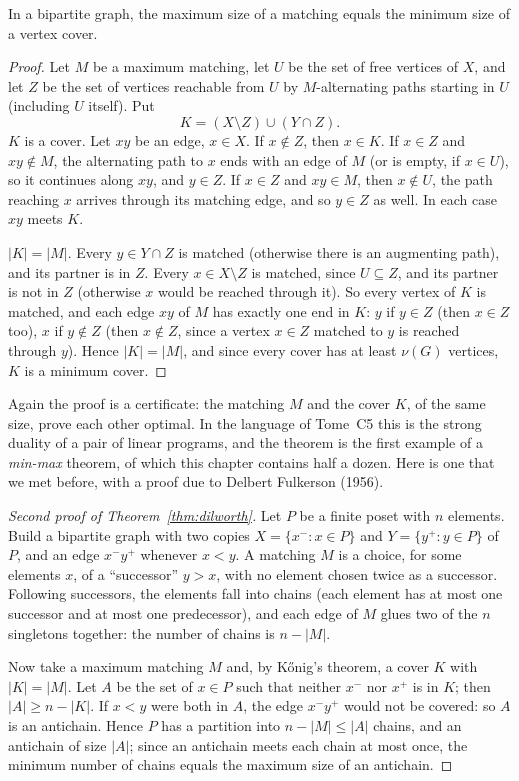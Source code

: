 \begin{theorem}\label{thm:konig}
In a bipartite graph, the maximum size of a matching equals the minimum size of a vertex cover.
\end{theorem}
\begin{proof}
Let $M$ be a maximum matching, let $U$ be the set of free vertices of $X$, and let $Z$ be the set of vertices reachable from $U$ by
$M$-alternating paths starting in $U$ (including $U$ itself). Put
\[
K=(X\setminus Z)\cup(Y\cap Z).
\]
$K$ is a cover. Let $xy$ be an edge, $x\in X$. If $x\notin Z$, then $x\in K$. If $x\in Z$ and $xy\notin M$, the alternating path to $x$ ends with an edge of $M$ (or
is empty, if $x\in U$), so it continues along $xy$, and $y\in Z$. If $x\in Z$ and $xy\in M$, then $x\notin U$, the path reaching $x$ arrives through its
matching edge, and so $y\in Z$ as well. In each case $xy$ meets $K$.

$|K|=|M|$. Every $y\in Y\cap Z$ is matched (otherwise there is an augmenting path), and its partner is in $Z$. Every $x\in X\setminus Z$ is matched, since
$U\subseteq Z$, and its partner is not in $Z$ (otherwise $x$ would be reached through it). So every vertex of $K$ is matched, and each edge $xy$ of
$M$ has exactly one end in $K$: $y$ if $y\in Z$ (then $x\in Z$ too), $x$ if $y\notin Z$ (then $x\notin Z$, since a vertex $x\in Z$ matched to $y$
is reached through $y$). Hence $|K|=|M|$, and since every cover has at least $\nu(G)$ vertices, $K$ is a minimum cover.
\end{proof}

Again the proof is a certificate: the matching $M$ and the cover $K$, of the same size, prove each other optimal. In the
language of Tome~C5 this is the strong duality of a pair of linear programs, and the theorem is the first example of a
\emph{min-max} theorem, of which this chapter contains half a dozen. Here is one that we met before, with a proof due to Delbert Fulkerson (1956).

\begin{proof}[Second proof of Theorem~\ref{thm:dilworth}]
Let $P$ be a finite poset with $n$ elements. Build a bipartite graph with two copies $X=\{x^-:x\in P\}$ and $Y=\{y^+:y\in P\}$ of $P$, and an edge
$x^-y^+$ whenever $x<y$. A matching $M$ is a choice, for some elements $x$, of a ``successor'' $y>x$, with no element chosen twice as a
successor. Following successors, the elements fall into chains (each element has at most one successor and at most one predecessor),
and each edge of $M$ glues two of the $n$ singletons together: the number of chains is $n-|M|$.

Now take a maximum matching $M$ and, by K\H onig's theorem, a cover $K$ with $|K|=|M|$. Let $A$ be the set of $x\in P$ such that neither
$x^-$ nor $x^+$ is in $K$; then $|A|\ge n-|K|$. If $x<y$ were both in $A$, the edge $x^-y^+$ would not be covered: so $A$ is an antichain. Hence
$P$ has a partition into $n-|M|\le|A|$ chains, and an antichain of size $|A|$; since an antichain meets each chain at most once, the
minimum number of chains equals the maximum size of an antichain.
\end{proof}


